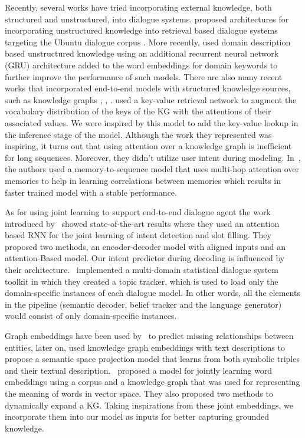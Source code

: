 \documentclass[runningheads]{llncs}
\begin{document}
Recently, several works have tried incorporating external knowledge, both structured and unstructured, into dialogue systems.
\cite{lowe2015incorporating} \cite{xu2016incorporating} \cite{kosovan-2017-cscubs-dialogues} proposed architectures for incorporating unstructured knowledge into retrieval based dialogue systems targeting the Ubuntu dialogue corpus \cite{DBLP:journals/corr/LowePSP15}. More recently, \cite{chaudhuri2018improving} used domain description based unstructured knowledge using an additional recurrent neural network (GRU) architecture added to the word embeddings for domain keywords to further improve the performance of such models.
There are also many recent works that incorporated end-to-end models with structured knowledge sources, such as knowledge graphs \cite{wen2016network}, \cite{dhingra2016towards}, \cite{williamsend}. \cite{eric-manning:2017:SIGDIAL} used a key-value retrieval network to augment the vocabulary distribution of the keys of the KG with the attentions of their associated values. We were inspired by this model to add the key-value lookup in the inference stage of the model. Although the work they represented was inspiring, it turns out that using attention over a knowledge graph is inefficient for long sequences. Moreover, they didn't utilize user intent during modeling. In~\cite{P18-1136}, the authors used a memory-to-sequence model that uses multi-hop attention over memories to help in learning correlations between memories which results in faster trained model with a stable performance. 

As for using joint learning to support end-to-end dialogue agent the work introduced by~\cite{liuBing2016} showed state-of-the-art results where they used an attention based RNN for the joint learning of intent detection and slot filling. They proposed two methods, an encoder-decoder model with aligned inputs and an attention-Based model. Our intent predictor during decoding is influenced by their architecture. \cite{P17-4013}~implemented a multi-domain statistical dialogue system toolkit in which they created a topic tracker, which is used to load only the domain-specific instances of each dialogue model. In other words, all the elements in the pipeline (semantic decoder, belief tracker and the language generator) would consist of only domain-specific instances.  

Graph embeddings have been used by~\cite{Dettmers2018} to predict missing relationships between entities, later on, \cite{Xiao2017} used knowledge graph embeddings with text descriptions to propose a semantic space projection model that learns from both symbolic triples and their textual description. \cite{alsuhaibani2018jointly}~proposed a model for jointly learning word embeddings using a corpus and a knowledge graph that was used for representing the meaning of words in vector space. They also proposed two methods to dynamically expand a KG. Taking inspirations from these joint embeddings, we incorporate them into our model as inputs for better capturing grounded knowledge.
\end{document}
